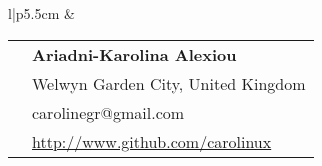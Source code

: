 \documentclass[9pt]{article} %
\begin{document}
\begin{minipage}[t]{0.44\textwidth} %
\vspace{0pt} %


\colorbox{shade}{\textcolor{text1}{
        \begin{tabular}{l|p{5.5cm}}
            \raisebox{-1.25cm}{} &
        \begin{tabular}{l|p{5cm}}
    \raisebox{0pt}{\Smiley} & \textbf{Ariadni-Karolina Alexiou} \\ %
            \raisebox{-1pt}{\textifsymbol{18}}& Welwyn Garden City, United Kingdom \\ %
    \raisebox{-1pt}{\Letter} & carolinegr@gmail.com \\ %
    \Keyboard & \href{http://www.github.com/carolinux}{http://www.github.com/carolinux} \\ %
        \end{tabular}  \\ %
\end{tabular}
}
}\\[10pt]









\end{minipage}
\end{document}

